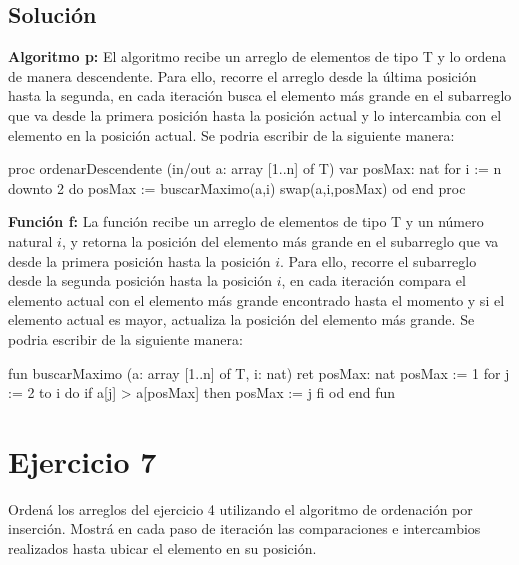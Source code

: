 \documentclass{article}
\newcounter{ejer}[section]
\begin{document}
\subsection*{Solución}
\textbf{Algoritmo p:} El algoritmo recibe un arreglo de elementos de tipo T y lo ordena de manera descendente. Para ello, recorre el arreglo desde la última posición hasta la segunda, en cada iteración busca el elemento más grande en el subarreglo que va desde la primera posición hasta la posición actual y lo intercambia con el elemento en la posición actual.
Se podria escribir de la siguiente manera:
\begin{pascallike}
proc ordenarDescendente (in/out a: array [1..n] of T)
  var posMax: nat
  for i := n downto 2 do
    posMax := buscarMaximo(a,i)
    swap(a,i,posMax)
  od
end proc
\end{pascallike}

\textbf{Función f:} La función recibe un arreglo de elementos de tipo T y un número natural $i$, y retorna la posición del elemento más grande en el subarreglo que va desde la primera posición hasta la posición $i$. Para ello, recorre el subarreglo desde la segunda posición hasta la posición $i$, en cada iteración compara el elemento actual con el elemento más grande encontrado hasta el momento y si el elemento actual es mayor, actualiza la posición del elemento más grande.
Se podria escribir de la siguiente manera:
\begin{pascallike}
fun buscarMaximo (a: array [1..n] of T, i: nat) ret posMax: nat
  posMax := 1
  for j := 2 to i do
    if a[j] > a[posMax] then
      posMax := j
    fi
  od
end fun
\end{pascallike}

\newpage

\section*{Ejercicio 7}
Ordená los arreglos del ejercicio 4 utilizando el algoritmo de ordenación por inserción. Mostrá en cada paso de iteración las comparaciones e intercambios realizados hasta ubicar el elemento en su posición.
\end{document}
